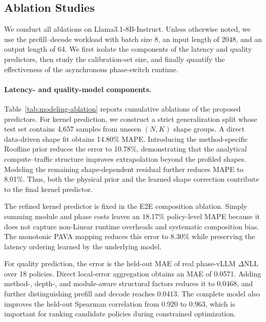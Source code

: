 
\subsection{Ablation Studies}
\label{sec:ablation}

We conduct all ablations on Llama3.1-8B-Instruct. Unless otherwise noted, we
use the prefill--decode workload with batch size 8, an input length of 2048,
and an output length of 64. We first isolate the components of the latency and
quality predictors, then study the calibration-set size, and finally quantify
the effectiveness of the asynchronous phase-switch runtime.

\paragraph{Latency- and quality-model components.}
Table~\ref{tab:modeling-ablation} reports cumulative ablations of the proposed
predictors. For kernel prediction, we construct a strict generalization split
whose test set contains 4,657 samples from unseen $(N,K)$ shape groups. A
direct data-driven shape fit obtains 14.80\% MAPE. Introducing the
method-specific Roofline prior reduces the error to 10.78\%, demonstrating
that the analytical compute--traffic structure improves extrapolation beyond
the profiled shapes. Modeling the remaining shape-dependent residual further
reduces MAPE to 8.01\%. Thus, both the physical prior and the learned shape
correction contribute to the final kernel predictor.

The refined kernel predictor is fixed in the E2E composition ablation. Simply
summing module and phase costs leaves an 18.17\% policy-level MAPE because it
does not capture non-Linear runtime overheads and systematic composition bias.
The monotonic PAVA mapping reduces this error to 8.30\% while preserving the
latency ordering learned by the underlying model.

For quality prediction, the error is the held-out MAE of real phase-vLLM
$\Delta\mathrm{NLL}$ over 18 policies. Direct local-error aggregation obtains
an MAE of 0.0571. Adding method-, depth-, and module-aware structural factors
reduces it to 0.0468, and further distinguishing prefill and decode reaches
0.0413. The complete model also improves the held-out Spearman correlation
from 0.920 to 0.963, which is important for ranking candidate policies during
constrained optimization.

